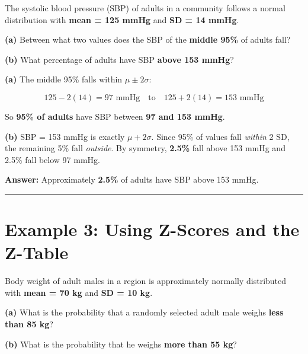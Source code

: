 \documentclass[
  12pt,
  letterpaper,
]{book}
\begin{document}
The systolic blood pressure (SBP) of adults in a community follows a
normal distribution with \textbf{mean = 125 mmHg} and \textbf{SD = 14
mmHg}.

\textbf{(a)} Between what two values does the SBP of the \textbf{middle
95\%} of adults fall?

\textbf{(b)} What percentage of adults have SBP \textbf{above 153 mmHg}?

\begin{tcolorbox}[enhanced jigsaw, arc=.35mm, bottomrule=.15mm, bottomtitle=1mm, breakable, colback=white, colbacktitle=quarto-callout-tip-color!10!white, colframe=quarto-callout-tip-color-frame, coltitle=black, left=2mm, leftrule=.75mm, opacityback=0, opacitybacktitle=0.6, rightrule=.15mm, title={✅ Solution}, titlerule=0mm, toprule=.15mm, toptitle=1mm]

\textbf{(a)} The middle 95\% falls within \(\mu \pm 2\sigma\):

\[125 - 2(14) = 97 \text{ mmHg} \quad \text{to} \quad 125 + 2(14) = 153 \text{ mmHg}\]

So \textbf{95\% of adults} have SBP between \textbf{97 and 153 mmHg}.

\textbf{(b)} SBP = 153 mmHg is exactly \(\mu + 2\sigma\). Since 95\% of
values fall \emph{within} 2 SD, the remaining 5\% fall \emph{outside}.
By symmetry, \textbf{2.5\%} fall above 153 mmHg and 2.5\% fall below 97
mmHg.

\textbf{Answer:} Approximately \textbf{2.5\%} of adults have SBP above
153 mmHg.

\end{tcolorbox}

\begin{center}\rule{0.5\linewidth}{0.5pt}\end{center}

\section{Example 3: Using Z-Scores and the
Z-Table}\label{example-3-using-z-scores-and-the-z-table}

Body weight of adult males in a region is approximately normally
distributed with \textbf{mean = 70 kg} and \textbf{SD = 10 kg}.

\textbf{(a)} What is the probability that a randomly selected adult male
weighs \textbf{less than 85 kg}?

\textbf{(b)} What is the probability that he weighs \textbf{more than 55
kg}?
\end{document}
